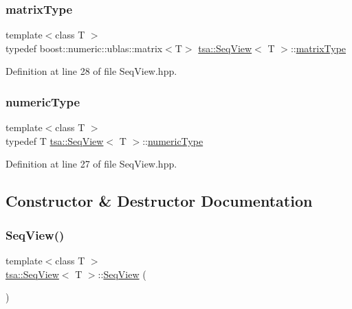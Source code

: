 \subsubsection{\texorpdfstring{matrix\+Type}{matrixType}}
{\footnotesize\ttfamily template$<$class T $>$ \\
typedef boost\+::numeric\+::ublas\+::matrix$<$T$>$ \hyperlink{classtsa_1_1_seq_view}{tsa\+::\+Seq\+View}$<$ T $>$\+::\hyperlink{classtsa_1_1_seq_view_a2402583f29cfbb491586ab529be3e27f}{matrix\+Type}}



Definition at line 28 of file Seq\+View.\+hpp.

\mbox{\label{classtsa_1_1_seq_view_a72b689db78d0feea3305e62cc3852a1d}} 
\subsubsection{\texorpdfstring{numeric\+Type}{numericType}}
{\footnotesize\ttfamily template$<$class T $>$ \\
typedef T \hyperlink{classtsa_1_1_seq_view}{tsa\+::\+Seq\+View}$<$ T $>$\+::\hyperlink{classtsa_1_1_seq_view_a72b689db78d0feea3305e62cc3852a1d}{numeric\+Type}}



Definition at line 27 of file Seq\+View.\+hpp.



\subsection{Constructor \& Destructor Documentation}
\mbox{\label{classtsa_1_1_seq_view_ad5d0fa3c39a124fec0c4b4711f1f621c}} 
\subsubsection{\texorpdfstring{Seq\+View()}{SeqView()}\hspace{0.1cm}{\footnotesize\ttfamily [1/3]}}
{\footnotesize\ttfamily template$<$class T $>$ \\
\hyperlink{classtsa_1_1_seq_view}{tsa\+::\+Seq\+View}$<$ T $>$\+::\hyperlink{classtsa_1_1_seq_view}{Seq\+View} (\begin{DoxyParamCaption}{ }\end{DoxyParamCaption})\hspace{0.3cm}{\ttfamily [inline]}}

